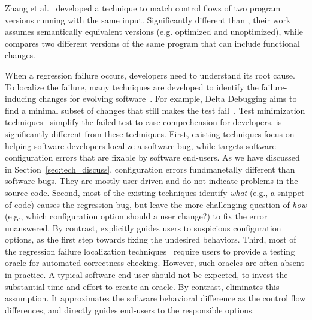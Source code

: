 Zhang et al.~\cite{Zhang:2005:MEH} developed a technique to match
control flows of two program versions running with
the same input. Significantly different than \ourtool, their
work assumes semantically equivalent versions (e.g. optimized
and unoptimized), while \ourtool compares two different versions
of the same program that can include functional changes. 

When a regression failure occurs, developers need
to understand its root cause. To localize the
failure, many techniques are developed to identify the
failure-inducing changes for evolving
software~\cite{Banerjee:2010:GID, r2fix, Qi:2009:DAD, Hoffman:2009:STA}.
For example, Delta Debugging aims to find a minimal
subset of changes that still makes the test fail~\cite{dd}.
Test minimization techniques~\cite{Hoffman:2009:STA, Zhang:2013:PST}
simplify the failed
test to ease comprehension for developers. 
\ourtool is significantly different from these techniques.
First, existing techniques focus on helping software developers
localize a software bug, while \ourtool targets software
configuration errors that are fixable by software end-users.
As we have discussed in Section~\ref{sec:tech_discuss},
configuration errors fundmanetally different than software bugs.
They are mostly user driven and do not indicate problems in the source
code. Second, most of the existing techniques identify
\textit{what} (e.g., a snippet of code) causes the
regression bug, but leave
the more challenging question of \textit{how} (e.g., which
configuration option should a user change?) to
fix the error unanswered. By contrast, \ourtool
explicitly guides users to suspicious configuration options,
as the first step towards fixing the undesired behaviors.
Third, most of the regression failure localization
techniques~\cite{dd} require users to provide
a testing oracle for automated correctness checking. However,
such oracles are often absent in practice. A typical
software end user should not be expected, to invest
the substantial time and effort to create an oracle.
By contrast, \ourtool eliminates this assumption. It 
approximates the software behavioral difference as the control
flow differences, and directly guides end-users to the
responsible options.


